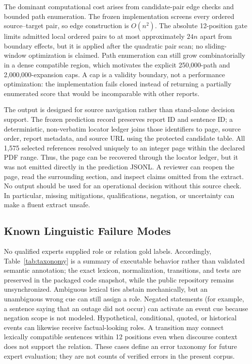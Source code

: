 \documentclass[applsci,article,submit,moreauthors]{Definitions/mdpi}
\begin{document}
The dominant computational cost arises from candidate-pair edge checks and bounded path enumeration. The frozen implementation screens every ordered source--target pair, so edge construction is $O(n^2)$. The absolute 12-position gate limits admitted local ordered pairs to at most approximately $24n$ apart from boundary effects, but it is applied after the quadratic pair scan; no sliding-window optimization is claimed. Path enumeration can still grow combinatorially in a dense compatible region, which motivates the explicit 250,000-path and 2,000,000-expansion caps. A cap is a validity boundary, not a performance optimization: the implementation fails closed instead of returning a partially enumerated score that would be incomparable with other reports.

The output is designed for source navigation rather than stand-alone decision support. The frozen prediction record preserves report ID and sentence ID; a deterministic, non-verbatim locator ledger joins those identifiers to page, source order, report metadata, and source URL using the protected candidate table. All 1,575 selected references resolved uniquely to an integer page within the declared PDF range. Thus, the page can be recovered through the locator ledger, but it was not emitted directly in the prediction JSONL. A reviewer can reopen the page, read the surrounding section, and inspect claims omitted from the extract. No output should be used for an operational decision without this source check. In particular, missing mitigations, qualifications, negation, or uncertainty can make a fluent extract unsafe.

\subsection{Known Linguistic Failure Modes}

No qualified experts supplied role or relation gold labels. Accordingly, Table~\ref{tab:taxonomy} is a summary of executable behavior rather than validated semantic annotation; the exact lexicon, normalization, transitions, and tests are preserved in the packaged code snapshot, while the public repository remains unsynchronized. Ambiguous lexical ties abstain mechanically, but an unambiguous wrong cue can still assign a role. Negated statements (for example, a sentence saying that an outage did not occur) can activate an event cue because negation scope is not modeled. Hypothetical, conditional, quoted, or historical events can likewise receive factual-looking roles. A transition may connect lexically compatible sentences within 12 positions even when discourse context does not support the relation. These cases define an error taxonomy for future expert evaluation; they are not counts of verified errors in the present corpus.
\end{document}
